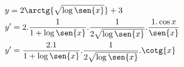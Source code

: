 \begin{ex}
\begin{align}
&y=2\arctg{\sqrt{\log{\sen{x}}}}+3\nonumber\\
&y'=2.\frac{1}{1+\log{\sen{x}}}.\frac{1}{2\sqrt{\log{\sen{x}}}}.\frac{1.\cos{x}}{\sen{x}}\nonumber\\
&y'=\frac{2.1}{1+\log{\sen{x}}}.\frac{1}{2\sqrt{\log{\sen{x}}}}.\cotg{x}\nonumber
\end{align}
\end{ex}
